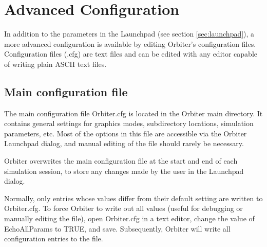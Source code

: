 \documentclass[Orbiter User Manual.tex]{subfiles}
\begin{document}
\section{Advanced Configuration}
In addition to the parameters in the Launchpad (see section
\ref{sec:launchpad}), a more advanced configuration is available by editing
Orbiter's configuration files. Configuration files (.cfg) are text files and can
be edited with any editor capable of writing plain ASCII text files.


\subsection{Main configuration file}
The main configuration file Orbiter.cfg is located in the Orbiter main
directory. It contains general settings for graphics modes, subdirectory
locations, simulation parameters, etc. Most of the options in this file are
accessible via the Orbiter Launchpad dialog, and manual editing of the file
should rarely be necessary.

Orbiter overwrites the main configuration file at the start and end of each
simulation session, to store any changes made by the user in the Launchpad
dialog.

Normally, only entries whose values differ from their default setting are
written to Orbiter.cfg. To force Orbiter to write out all values (useful for
debugging or manually editing the file), open Orbiter.cfg in a text editor,
change the value of EchoAllParams to TRUE, and save. Subsequently, Orbiter will
write all configuration entries to the file.
\end{document}
